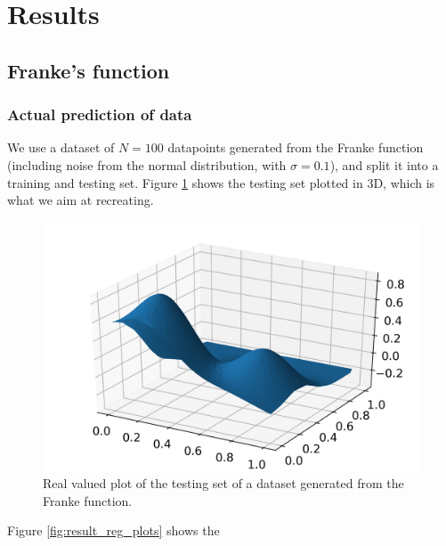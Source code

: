 \documentclass[../main.tex]{subfiles}
\begin{document}
\section{Results}\label{sec:results}
\subsection{Franke's function}
\subsubsection{Actual prediction of data}
We use a dataset of $N=100$ datapoints generated from the Franke function (including noise from the normal distribution, with $\sigma=0.1$), and split it into a training and testing set. Figure \ref{fig:result_actual_plot} shows the testing set plotted in 3D, which is what we aim at recreating.

\begin{figure}[h]
    \centering
    \includegraphics[width=\textwidth]{../assets/actual_franke_plot.png}
    \caption{Real valued plot of the testing set of a dataset generated from the Franke function.}
    \label{fig:result_actual_plot}
\end{figure}

Figure \ref{fig:result_reg_plots} shows the 
\end{document}
